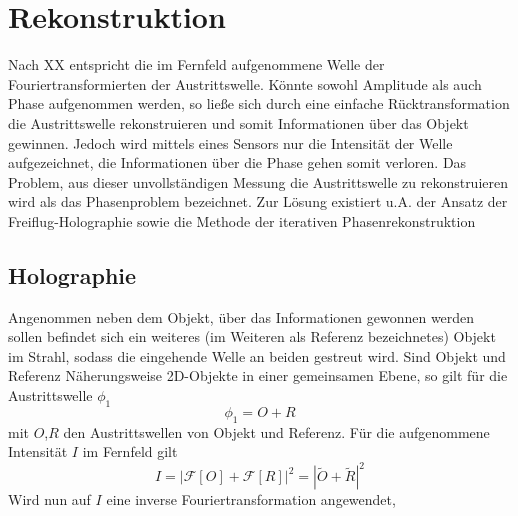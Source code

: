 \chapter{Rekonstruktion}
Nach XX entspricht die im Fernfeld aufgenommene Welle der Fouriertransformierten der Austrittswelle. Könnte sowohl Amplitude als auch Phase aufgenommen werden, so ließe sich durch eine einfache Rücktransformation die Austrittswelle rekonstruieren und somit Informationen über das Objekt gewinnen. Jedoch wird mittels eines Sensors nur die Intensität der Welle aufgezeichnet, die Informationen über die Phase gehen somit verloren. Das Problem, aus dieser unvollständigen Messung die Austrittswelle zu rekonstruieren wird als das Phasenproblem bezeichnet. Zur Lösung existiert u.A. der Ansatz der Freiflug-Holographie sowie die Methode der iterativen Phasenrekonstruktion
\section{Holographie}
Angenommen neben dem Objekt, über das Informationen gewonnen werden sollen befindet sich ein weiteres (im Weiteren als Referenz bezeichnetes) Objekt im Strahl, sodass die eingehende Welle an beiden gestreut wird. Sind Objekt und Referenz Näherungsweise 2D-Objekte in einer gemeinsamen Ebene, so gilt für die Austrittswelle $\phi_1$
\begin{equation}
	\phi_1=O+R
\end{equation}
mit $O$,$R$ den Austrittswellen von Objekt und Referenz. Für die aufgenommene Intensität $I$ im Fernfeld gilt
\begin{equation}
I=\left|\mathscr{F}\left[O\right]+\mathscr{F}\left[R\right]\right|^2=\left|\tilde{O}+\tilde{R}\right|^2
\end{equation}
Wird nun auf $I$ eine inverse Fouriertransformation angewendet,

